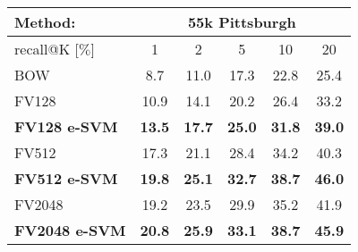 \begin{tabularx}{0.955\linewidth}{|l|c c c c c|}
	\hline 
	\rowcolor{maroon!50}
	Method: & \multicolumn{5}{c|}{55k Pittsburgh} \\
	\hline 
	\hline 
	\rowcolor{maroon!50}
	recall@K [$\%$] 			& 1 & 2 & 5 & 10 & 20 \\
	\hline
	\rowcolor{maroon!10}
	BOW         				& 8.7 & 11.0 & 17.3 & 22.8 & 25.4  \\
	\hline
	\rowcolor{maroon!10}
	FV128         				& 10.9 & 14.1 & 20.2 & 26.4 & 33.2 \\
	\rowcolor{maroon!10}
	\textbf{FV128 e-SVM} 		& \textbf{13.5}  &  \textbf{17.7}  &  \textbf{25.0}  &  \textbf{31.8}  &  \textbf{39.0} \\
	\hline
	\rowcolor{maroon!10}
	FV512         				& 17.3 &  21.1 &  28.4 &  34.2 &  40.3 \\
	\rowcolor{maroon!10}
	\textbf{FV512 e-SVM}   		& \textbf{19.8} &  \textbf{25.1} &  \textbf{32.7}  & \textbf{38.7} &  \textbf{46.0} \\
	\hline
	\rowcolor{maroon!10}
	FV2048        				& 19.2 & 23.5 & 29.9 &  35.2 &  41.9 \\
	\rowcolor{maroon!10}
	\textbf{FV2048 e-SVM}  		& \textbf{20.8} & \textbf{25.9} & \textbf{33.1} & \textbf{38.7} & \textbf{45.9} \\
	\hline
\end{tabularx}
